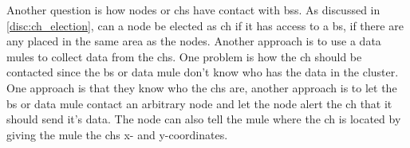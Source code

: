 \documentclass[USenglish]{uit-thesis}
\begin{document}
Another question is how nodes or \glspl{ch} have contact with \glspl{bs}. As discussed in \autoref{disc:ch_election}, can a node be elected as \gls{ch} if it has access to a \gls{bs}, if there are any placed in the same area as the nodes. Another approach is to use a data mules to collect data from the \glspl{ch}.
One problem is how the \gls{ch} should be contacted since the \gls{bs} or data mule don't know who has the data in the cluster. One approach is that they know who the \glspl{ch} are, another approach is to let the \gls{bs} or data mule contact an arbitrary node and let the node alert the \gls{ch} that it should send it's data. The node can also tell the mule where the \gls{ch} is located by giving the mule the \glspl{ch} x- and y-coordinates.








\end{document}
